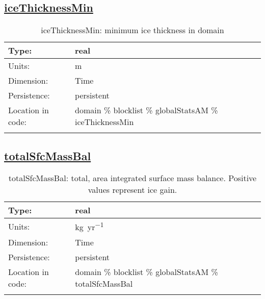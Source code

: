 \subsection[iceThicknessMin]{\hyperref[sec:var_tab_globalStatsAM]{iceThicknessMin}}
\label{subsec:var_sec_globalStatsAM_iceThicknessMin}
\begin{center}
\begin{longtable}{| p{2.0in} | p{4.0in} |}
        \hline 
        Type: & real \\
        \hline 
        Units: & \si{m} \\
        \hline 
        Dimension: & Time \\
        \hline 
        Persistence: & persistent \\
        \hline 
         Location in code: & domain \% blocklist \% globalStatsAM \% iceThicknessMin \\
         \hline 
    \caption{iceThicknessMin: minimum ice thickness in domain}
\end{longtable}
\end{center}
\subsection[totalSfcMassBal]{\hyperref[sec:var_tab_globalStatsAM]{totalSfcMassBal}}
\label{subsec:var_sec_globalStatsAM_totalSfcMassBal}
\begin{center}
\begin{longtable}{| p{2.0in} | p{4.0in} |}
        \hline 
        Type: & real \\
        \hline 
        Units: & \si{kg.yr^{-1}} \\
        \hline 
        Dimension: & Time \\
        \hline 
        Persistence: & persistent \\
        \hline 
         Location in code: & domain \% blocklist \% globalStatsAM \% totalSfcMassBal \\
         \hline 
    \caption{totalSfcMassBal: total, area integrated surface mass balance. Positive values represent ice gain.}
\end{longtable}
\end{center}
